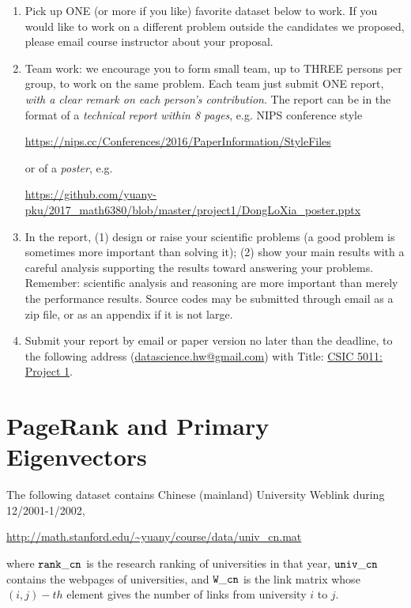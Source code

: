 \documentclass[11pt]{article}
\begin{document}
\begin{enumerate}
\item Pick up ONE (or more if you like) favorite dataset below to work. If you would like to work on a different problem outside the candidates we proposed, please email course instructor about your proposal.  
\item Team work: we encourage you to form small team, up to THREE persons per group, to work on the same problem. Each team just submit ONE report, \emph{with a clear remark on each person's contribution}. The report can be in the format of a \emph{technical report within 8 pages}, e.g. NIPS conference style 
\begin{center}
\url{https://nips.cc/Conferences/2016/PaperInformation/StyleFiles} 
\end{center}
or of a \emph{poster}, e.g. 
\begin{center}%
\url{https://github.com/yuany-pku/2017_math6380/blob/master/project1/DongLoXia_poster.pptx}
\end{center}
\item In the report, (1) design or raise your scientific problems (a good problem is sometimes more important than solving it); (2) show your main results with a careful analysis supporting the results toward answering your problems. Remember: scientific analysis and reasoning are more important than merely the performance results. Source codes may be submitted through email as a zip file, or as an appendix if it is not large.    
\item Submit your report by email or paper version no later than the deadline, to the following address (\href{mailto:datascience.hw@gmail.com}{datascience.hw@gmail.com}) with Title: \underline{CSIC 5011: Project 1}. %
\end{enumerate}


\section{PageRank and Primary Eigenvectors}

The following dataset contains Chinese (mainland) University Weblink during 12/2001-1/2002,

\url{http://math.stanford.edu/~yuany/course/data/univ_cn.mat}

\noindent where $\tt{rank\_{}cn}$ is the research ranking of universities in that year, $\tt{univ\_{}cn}$ contains the webpages of universities, and $\tt{W\_{}cn}$ is the link matrix whose $(i,j)-th$ element gives the number of links from university
$i$ to $j$. 
 
\end{document}
